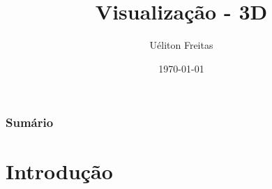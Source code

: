 \documentclass{beamer}
\title[Computação Gráfica]{Visualização - 3D} %
\author{Uéliton Freitas} %
\institute[UFMS] %
{
Universidade Católica Dom Bosco - UCDB \\ %
\medskip
\textit{freitas.ueliton@gmail.com} %
}
\date{\today} %
\begin{document}
\begin{frame}
\titlepage %
\end{frame}

\begin{frame}
\frametitle{Sumário} %
\tableofcontents %
\end{frame}





\section{Introdução} 

\end{document}
